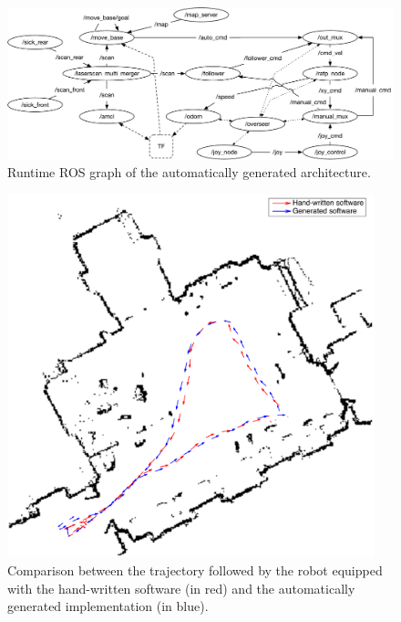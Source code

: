 \begin{landscape}
	\begin{figure}[t]
	\centering
	\includegraphics[width=0.95\textheight]{gfx/pmk/gen-graph}
	\caption{Runtime ROS graph of the automatically generated architecture.}
	\label{fig:gen-graph}
	\end{figure}
\end{landscape}

\begin{figure}[t]
\centering
\includegraphics[width=0.95\textwidth]{gfx/pmk/path-followed}
\caption[Trajectory comparison.]{Comparison between the trajectory followed by the robot equipped with the hand-written software (in red) and the automatically generated implementation (in blue).}
\label{fig:path}
\end{figure}

